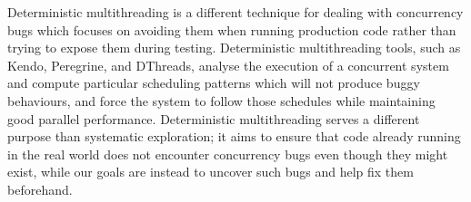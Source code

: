 Deterministic multithreading is a different technique for dealing with concurrency bugs which focuses on avoiding them when running production code rather than trying to expose them during testing. Deterministic multithreading tools, such as Kendo\cite{kendo}, Peregrine\cite{peregrine}, and DThreads\cite{dthreads}, analyse the execution of a concurrent system and compute particular scheduling patterns which will not produce buggy behaviours, and force the system to follow those schedules while maintaining good parallel performance.
Deterministic multithreading serves a different purpose than systematic exploration; it aims to ensure that code already running in the real world does not encounter concurrency bugs even though they might exist, while our goals are instead to uncover such bugs and help fix them beforehand.

